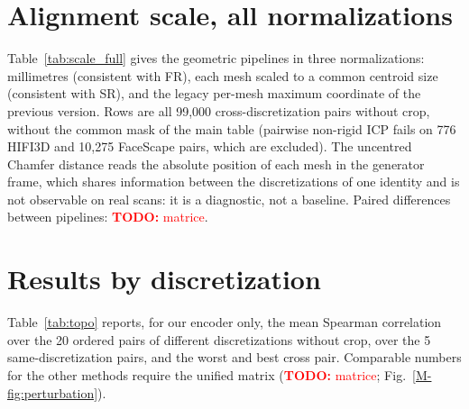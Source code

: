 \documentclass[10pt,twocolumn,letterpaper]{article}
\newcommand{\todo}[1]{\textcolor{red}{\textbf{TODO:} #1}}
\begin{document}
\FloatBarrier
\section{Alignment scale, all normalizations}
\label{sec:scale}
Table~\ref{tab:scale_full} gives the geometric pipelines in three normalizations: millimetres (consistent with FR), each mesh scaled to a common centroid size (consistent with SR), and the legacy per-mesh maximum coordinate of the previous version. Rows are all 99{,}000 cross-discretization pairs without crop, without the common mask of the main table (pairwise non-rigid ICP fails on 776 HIFI3D and 10{,}275 FaceScape pairs, which are excluded). The uncentred Chamfer distance reads the absolute position of each mesh in the generator frame, which shares information between the discretizations of one identity and is not observable on real scans: it is a diagnostic, not a baseline. Paired differences between pipelines: \todo{matrice}.

\begin{table}[t]
  \centering
  \scriptsize
  \caption{Geometric pipelines in three normalizations, FR and SR (baselines\_mm/spearman.csv).}
  \label{tab:scale_full}
  \resizebox{\textwidth}{!}{}
\end{table}

\FloatBarrier
\section{Results by discretization}
\label{sec:topo}
Table~\ref{tab:topo} reports, for our encoder only, the mean Spearman correlation over the 20 ordered pairs of different discretizations without crop, over the 5 same-discretization pairs, and the worst and best cross pair. Comparable numbers for the other methods require the unified matrix (\todo{matrice}; Fig.~\ref{M-fig:perturbation}).

\begin{table}[t]
  \centering
  \scriptsize
  \caption{Our encoder by pair of discretizations (topo\_pairs\_e3.csv; 99{,}000 rows, bootstrap seeds of the crop analysis).}
  \label{tab:topo}
  
\end{table}
\end{document}
